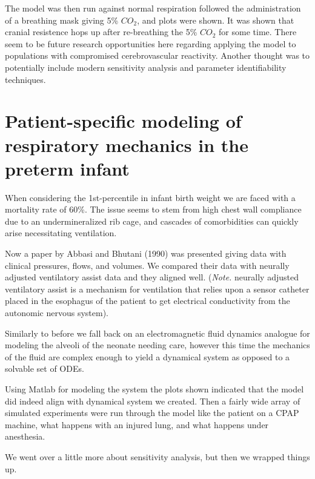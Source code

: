 \documentclass[12pt]{amsart}
\theoremstyle{definition}
\theoremstyle{question}
\begin{document}
\begin{onehalfspace}
        The model was then run against normal respiration followed the administration of a breathing mask
        giving 5\% $CO_2$, and plots were shown.
        It was shown that cranial resistence hops up after re-breathing the 5\% $CO_2$ for some time.
        There seem to be future research opportunities here regarding applying the model to populations with
        compromised cerebrovascular reactivity.
        Another thought was to potentially include modern sensitivity analysis and parameter identifiability
        techniques.

        \section{Patient-specific modeling of respiratory mechanics in the preterm infant}
        When considering the 1st-percentile in infant birth weight we are faced with a mortality rate
        of 60\%.
        The issue seems to stem from high chest wall compliance due to an undermineralized rib cage, and cascades
        of comorbidities can quickly arise necessitating ventilation.

        Now a paper by Abbasi and Bhutani (1990) was presented giving data with clinical pressures, flows, and volumes.
        We compared their data with neurally adjusted ventilatory assist data and they aligned well.
        (\emph{Note.} neurally adjusted ventilatory assist is a mechanism for ventilation that relies upon a sensor catheter
        placed in the esophagus of the patient to get electrical conductivity from the autonomic nervous system).

        Similarly to before we fall back on an electromagnetic fluid dynamics analogue for modeling the alveoli of the
        neonate needing care, however this time the mechanics of the fluid are complex enough to yield a dynamical system
        as opposed to a solvable set of ODEs.

        Using Matlab for modeling the system the plots shown indicated that the model did indeed align with dynamical system
        we created.
        Then a fairly wide array of simulated experiments were run through the model like the patient on a CPAP machine,
        what happens with an injured lung, and what happens under anesthesia.

        We went over a little more about sensitivity analysis, but then we wrapped things up.


    \end{onehalfspace}
\end{document}
